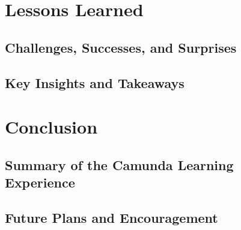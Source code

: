 \documentclass[12pt]{article}
\begin{document}
{\pagebreak

\section{Lessons Learned}
  \subsection{Challenges, Successes, and Surprises}
  \subsection{Key Insights and Takeaways}

\pagebreak

\section{Conclusion}
  \subsection{Summary of the Camunda Learning Experience}
  \subsection{Future Plans and Encouragement}

}

\printbibliography
\end{document}
